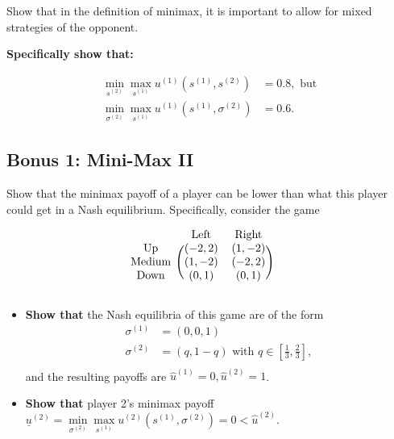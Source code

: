 \documentclass[10pt]{article}
\begin{document}
Show that in the definition of minimax, it is important to allow for mixed
strategies of the opponent.

\textbf{Specifically show that:}

\begin{align*}
    \min\limits_{s^{(2)}} \max\limits_{s^{(1)}} u^{(1)}(s^{(1)}, s^{(2)}) & = 0.8, \text{ but} \\
    \min\limits_{\sigma^{(2)}} \max\limits_{s^{(1)}} u^{(1)}(s^{(1)}, \sigma^{(2)}) & = 0.6.
\end{align*}


\subsection*{Bonus 1: Mini-Max II}

Show that the minimax payoff of a player can be lower than what this player
could get in a Nash equilibrium. Specifically, consider the game

\begin{equation*}
    \begin{blockarray}{cccc}
        & \text{Left} & \text{Right} \\
        \begin{block}{c(ccc)}
            \text{Up}  & (-2, 2)   & (1, -2)  \\
            \text{Medium} & (1, -2)   & (-2, 2)  \\
            \text{Down} & (0, 1) & (0, 1) \\
        \end{block}
    \end{blockarray}\qquad
\end{equation*}

\begin{itemize}
    \item \textbf{Show that} the Nash equilibria of this game are of the form
    \begin{align*}
        \sigma^{(1)} & = (0, 0, 1) \\
        \sigma^{(2)} & = (q, 1- q) \text{ with } q \in \left[\frac{1}{3}, \frac{2}{3}\right],\\
    \end{align*}
    and the resulting payoffs are \(\hat{u}^{(1)} = 0, \hat{u}^{(2)} = 1\).
    \item \textbf{Show that} player 2's minimax payoff \(\underline{u}^{(2)} =
    \min\limits_{\sigma^{(2)}} \max\limits_{s^{(1)}} u^{(2)}(s^{(1)},
    \sigma^{(2)}) = 0 < \hat{u}^{(2)}\).
\end{itemize}
\end{document}
